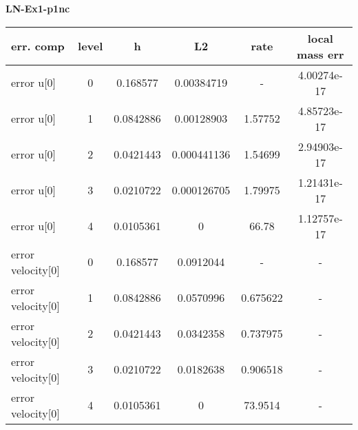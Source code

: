 \documentclass{amsart}
\begin{document}
\begin{center}   
{\bf LN-Ex1-p1nc }\end{center}  
\tableofcontents

\begin{table}[h!]
\begin{tabular}{|l|c|c|c|c|c|}
\hline
err. comp & level & h  & L2 & rate  & local mass err \\ 
\hline
error u[0] & 0 & 0.168577  & 0.00384719 & -   &  4.00274e-17 \\ 
error u[0] & 1 & 0.0842886 & 0.00128903 & 1.57752   &  4.85723e-17 \\ 
error u[0] & 2 & 0.0421443 & 0.000441136 & 1.54699   &  2.94903e-17 \\ 
error u[0] & 3 & 0.0210722 & 0.000126705 & 1.79975   &  1.21431e-17 \\ 
error u[0] & 4 & 0.0105361 & 0 & 66.78   &  1.12757e-17 \\ 
error velocity[0] & 0 & 0.168577  & 0.0912044 & -   & - \\ 
error velocity[0] & 1 & 0.0842886 & 0.0570996 & 0.675622   & - \\ 
error velocity[0] & 2 & 0.0421443 & 0.0342358 & 0.737975   & - \\ 
error velocity[0] & 3 & 0.0210722 & 0.0182638 & 0.906518   & - \\ 
error velocity[0] & 4 & 0.0105361 & 0 & 73.9514   & - \\ 

\hline
\end{tabular}
\end{table}
\end{document}
